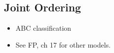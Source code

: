 
\subsection{Joint Ordering}

 
\begin{itemize}
\item ABC classification
\item See FP, ch 17 for other models.
\end{itemize}



